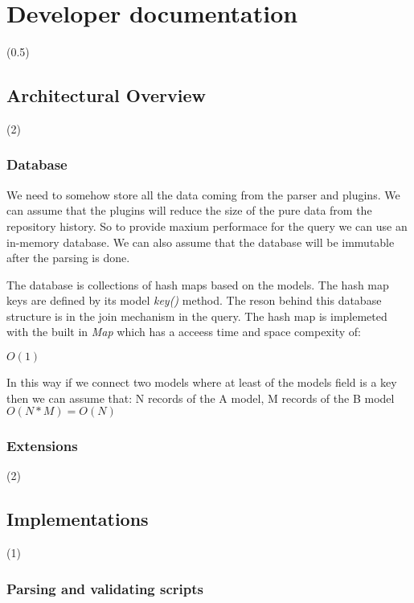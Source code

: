 \chapter{Developer documentation}
\label{ch:impl}

(0.5)

\section{Architectural Overview}

(2)

\subsection{Database}

We need to somehow store all the data coming from the parser and plugins. We can assume that the plugins will reduce the size of the
pure data from the repository history. So to provide maxium performace for the query we can use an in-memory database. 
We can also assume that the database will be immutable after the parsing is done. 

The database is collections of hash maps based on the models. The hash map keys are defined by its model \textit{key()} method.
The reson behind this database structure is in the join mechanism in the query. The hash map is implemeted with the built in 
\textit{Map} \cite{map} which has a acceess time and space compexity of:

\( O(1) \)

In this way if we connect two models where at least of the models field is a key then we can assume that:\newline
N records of the A model, M records of the B model
\(O(N * M) = O(N)\)

\subsection{Extensions}

(2)

\section{Implementations}

(1)

\subsection{Parsing and validating scripts}

